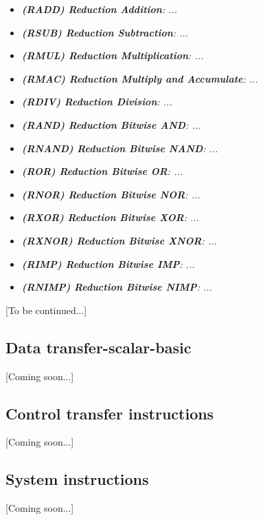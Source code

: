         \begin{multicols}{2}

            \begin{itemize}

                \item \textit{\textbf{(RADD) Reduction Addition}: ...}

                \item \textit{\textbf{(RSUB) Reduction Subtraction}: ...}

                \item \textit{\textbf{(RMUL) Reduction Multiplication}: ...}

                \item \textit{\textbf{(RMAC) Reduction Multiply and Accumulate}: ...}

                \item \textit{\textbf{(RDIV) Reduction Division}: ...}

                \item \textit{\textbf{(RAND) Reduction Bitwise AND}: ...}

                \item \textit{\textbf{(RNAND) Reduction Bitwise NAND}: ...}

                \item \textit{\textbf{(ROR) Reduction Bitwise OR}: ...}

                \item \textit{\textbf{(RNOR) Reduction Bitwise NOR}: ...}

                \item \textit{\textbf{(RXOR) Reduction Bitwise XOR}: ...}

                \item \textit{\textbf{(RXNOR) Reduction Bitwise XNOR}: ...}

                \item \textit{\textbf{(RIMP) Reduction Bitwise IMP}: ...}

                \item \textit{\textbf{(RNIMP) Reduction Bitwise NIMP}: ...}

            \end{itemize}

        \end{multicols}

        [To be continued...]

    \subsection{Data transfer-scalar-basic}

        [Coming soon...]

    \subsection{Control transfer instructions}

        [Coming soon...]

    \subsection{System instructions}

        [Coming soon...]